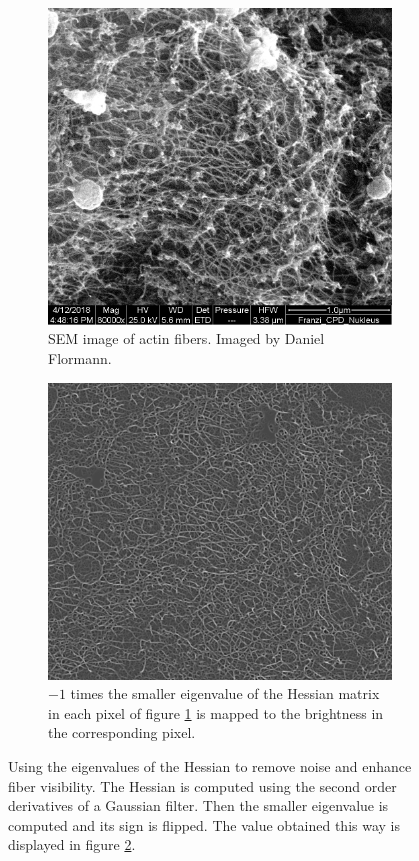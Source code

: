 \documentclass[12pt,english,twocolumn]{revtex4}
\begin{document}
\begin{figure}[h!]
    \centering
    \begin{subfigure}[b]{\linewidth}
        \includegraphics[width=\linewidth]{illustrations/og_image.png}
        \caption{SEM image of actin fibers. Imaged by Daniel Flormann.}
        \label{subfig:og1_1}
    \end{subfigure}
    \begin{subfigure}[b]{\linewidth}
        \includegraphics[width=\linewidth]{illustrations/og_viz_grey.png}
        \caption{$-1$ times the smaller eigenvalue of the Hessian matrix in each pixel of figure \ref{subfig:og1_1} is mapped to the brightness in the corresponding pixel.}
        \label{subfig:-lambda1_1}
    \end{subfigure}
    \caption{Using the eigenvalues of the Hessian to remove noise and enhance fiber visibility. The Hessian is computed using the second order derivatives of a Gaussian filter. Then the smaller eigenvalue is computed and its sign is flipped. The value obtained this way is displayed in figure \ref{subfig:-lambda1_1}.}
    \label{fig:-lambda1_vs_og_1}
\end{figure}
\end{document}
